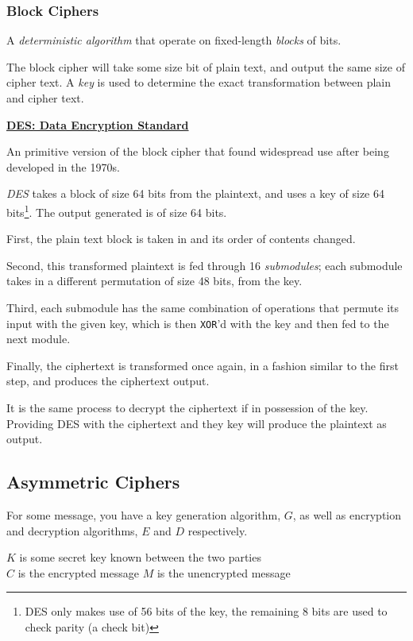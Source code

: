\documentclass{article}
\begin{document}
\subsubsection{Block Ciphers}

A \textit{deterministic algorithm} that operate on fixed-length \textit{blocks} of bits.

The block cipher will take some size bit of plain text, and output the same size of cipher text. A \textit{key} is used to determine the exact transformation between plain and cipher text.

\textbf{\underline{DES: Data Encryption Standard}}

An primitive version of the block cipher that found widespread use after being developed in the 1970s.

\textit{DES} takes a block of size 64 bits from the plaintext, and uses a key of size 64 bits\footnote{DES only makes use of 56 bits of the key, the remaining 8 bits are used to check parity (a check bit)}. The output generated is of size 64 bits.

First, the plain text block is taken in and its order of contents changed.

Second, this transformed plaintext is fed through 16 \textit{submodules}; each submodule takes in a different permutation of size 48 bits, from the key.

Third, each submodule has the same combination of operations that permute its input with the given key, which is then \texttt{XOR}'d with the key and then fed to the next module.

Finally, the ciphertext is transformed once again, in a fashion similar to the first step, and produces the ciphertext output.

It is the same process to decrypt the ciphertext if in possession of the key. Providing DES with the ciphertext and they key will produce the plaintext as output.

\subsection{Asymmetric Ciphers}

For some message, you have a key generation algorithm, $G$, as well as encryption and decryption algorithms, $E$ and $D$ respectively.

\vspace{.5cm}
\begin{center}
  $K$ is some secret key known between the two parties\\
  $C$ is the encrypted message
  $M$ is the unencrypted message
\end{center}
\end{document}
